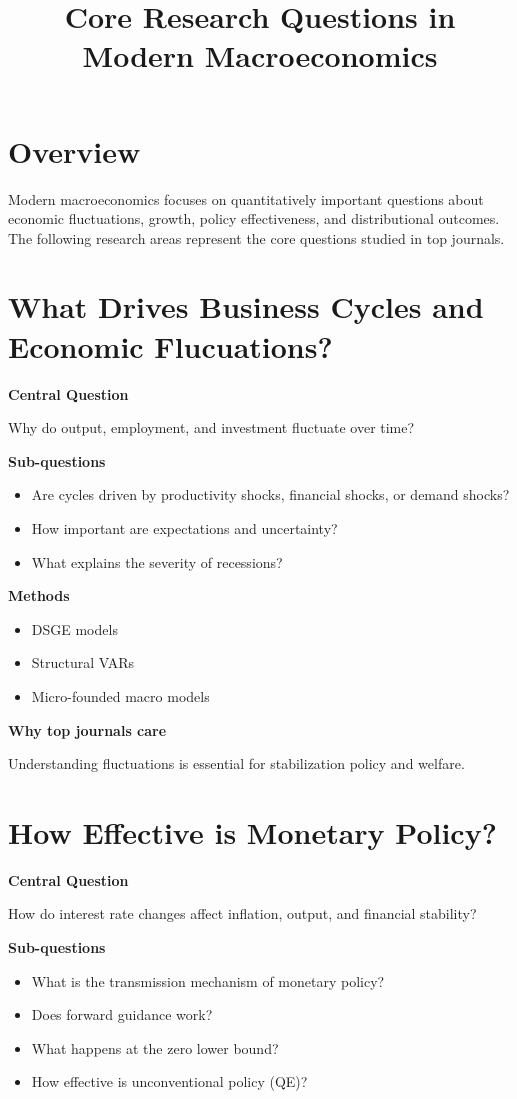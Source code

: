 \documentclass[12pt]{article}
\title{\textbf{Core Research Questions in Modern Macroeconomics}}
\date{}
\author{}
\begin{document}
\maketitle

\section*{Overview}
Modern macroeconomics focuses on quantitatively important questions about economic fluctuations, growth, policy effectiveness, and distributional outcomes. The following research areas represent the core questions studied in top journals.

\section{What Drives Business Cycles and Economic Flucuations?}

\textbf{Central Question}

Why do output, employment, and investment fluctuate over time?

\textbf{Sub-questions}
\begin{itemize}
\item Are cycles driven by productivity shocks, financial shocks, or demand shocks?
\item How important are expectations and uncertainty?
\item What explains the severity of recessions?
\end{itemize}

\textbf{Methods}
\begin{itemize}
\item DSGE models
\item Structural VARs
\item Micro-founded macro models
\end{itemize}

\textbf{Why top journals care}

Understanding fluctuations is essential for stabilization policy and welfare.

\section{How Effective is Monetary Policy?}

\textbf{Central Question}

How do interest rate changes affect inflation, output, and financial stability?

\textbf{Sub-questions}
\begin{itemize}
\item What is the transmission mechanism of monetary policy?
\item Does forward guidance work?
\item What happens at the zero lower bound?
\item How effective is unconventional policy (QE)?
\end{itemize}
\end{document}
